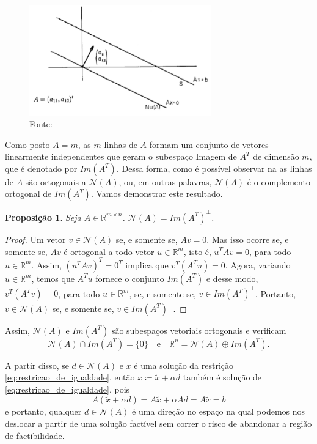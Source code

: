 \documentclass[12pt,a4paper]{scrartcl}
\def\RR{\mathds{R}}
\newtheorem{prop}{Proposição}
\theoremstyle{definition}%
\begin{document}
\begin{figure}[!h] 
	\centering
	\includegraphics[width=0.70\textwidth]{nucleoA_paralelo_S}
	\caption{Fonte: \textcite{Ana1994} \label{fig:nucleoA_paralelo_S}}
\end{figure}


Como posto $A=m$, as $m$ linhas de $A$ formam um conjunto de vetores linearmente independentes que geram o subespaço Imagem de $A^{T}$ de dimensão $m$, que é denotado por $Im(A^{T})$. Dessa forma, como é possível observar na  as linhas de $A$ são ortogonais a $\mathcal{N}(A)$, ou, em outras palavras, $\mathcal{N}(A)$ é o complemento ortogonal de $Im(A^{T})$. Vamos demonstrar este resultado. 

\begin{prop} \label{prop:complemento_ortogonal_nucleo}
Seja $A \in \RR^{m\times n}$. $\mathcal{N}(A) = Im(A^{T})^{\bot}$.
\end{prop}
\begin{proof}
Um vetor $v \in \mathcal{N}(A)$ se, e somente se, $Av=0$. Mas isso ocorre se, e somente se, $Av$ é ortogonal a todo vetor $u\in \RR^{m}$, isto é, $u^{T}Av=0$, para todo $u \in \RR^{m}$. Assim, $(u^{T}Av)^{T} = 0^{T}$ implica que $v^{T}(A^{T}u) = 0$. Agora, variando $u \in \RR^{m}$, temos que $A^{T}u$ fornece o conjunto $Im(A^{T})$ e desse modo, $v^{T}(A^{T}v) = 0$, para todo $u \in \RR^{m}$, se, e somente se, $v \in Im(A^{T})^{\bot}$. Portanto, $v\in \mathcal{N}(A)$ se, e somente se, $v\in Im(A^{T})^{\bot}$.
\end{proof}

Assim, $\mathcal{N}(A)$ e $Im(A^{T})$ são subespaços vetoriais ortogonais e verificam
\[ \mathcal{N}(A) \cap Im(A^{T}) = \{ 0 \} \quad \text{e} \quad \RR^{n} = \mathcal{N}(A) \oplus Im(A^{T}) .\]


A partir disso, se $d \in \mathcal{N}(A)$ e $\tilde{x}$ é uma solução da restrição \eqref{eq:restricao_de_igualdade}, então $x\coloneqq  \tilde{x} + \alpha d$ também é solução de \eqref{eq:restricao_de_igualdade}, pois
\[
A(\tilde{x} + \alpha d) = A\tilde{x}
 + \alpha Ad = A\tilde{x} = b
\]
 e portanto, qualquer $d \in \mathcal{N}(A)$ é uma direção no espaço na qual podemos nos deslocar a partir de uma solução factível sem correr o risco de abandonar a região de factibilidade. 
\end{document}
